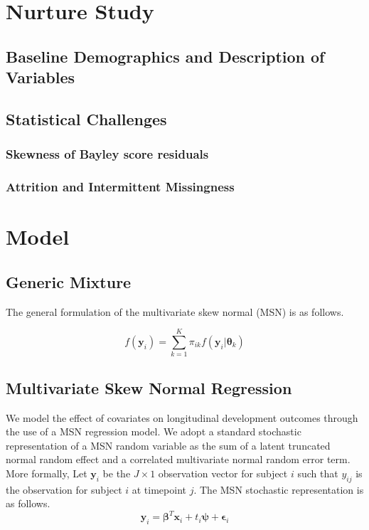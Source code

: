 \documentclass[useAMS,referee]{biom}
\begin{document}
\newpage

\section{Nurture Study}
\label{s:nurt}
\subsection{Baseline Demographics and Description of Variables}

\subsection{Statistical Challenges}
\subsubsection{Skewness of Bayley score residuals}
\subsubsection{Attrition and Intermittent Missingness}

\newpage

\section{Model}
\label{s:model}

\subsection{Generic Mixture}

The general formulation of the multivariate skew normal (MSN) is as follows. 

$$f(\mathbf{y}_i) = \sum_{k = 1}^{K} \pi_{ik} f(\mathbf{y}_i|\boldsymbol\theta_k)$$

\subsection{Multivariate Skew Normal Regression}

We model the effect of covariates on longitudinal development outcomes through the use of a MSN regression model. We adopt a standard stochastic representation of a MSN random variable as the sum of a latent truncated normal random effect and a correlated multivariate normal random error term. More formally, Let $\mathbf{y}_{i}$ be the $J \times 1$ observation vector for subject $i$ such that $y_{ij}$ is the observation for subject $i$ at timepoint $j$. The MSN stochastic representation is as follows.
$$\mathbf{y}_{i} = \boldsymbol\beta^T \mathbf{x}_{i} + t_{i}\boldsymbol\psi + \boldsymbol\epsilon_{i}$$
\end{document}
